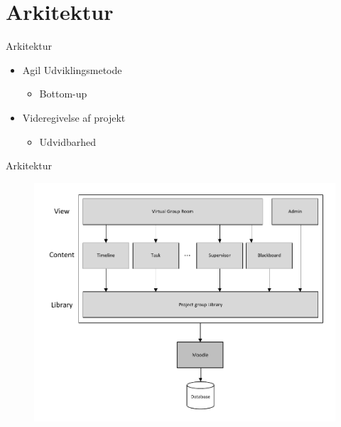 \section{Arkitektur}

\begin{frame}{Arkitektur}
\begin{itemize}
	\item Agil Udviklingsmetode
	\begin{itemize}
		\item Bottom-up  
	\end{itemize}
	\item Videregivelse af projekt
	\begin{itemize}
		\item Udvidbarhed
	\end{itemize}
	
\end{itemize}
\end{frame}


\begin{frame}{Arkitektur}
\begin{figure}%
\includegraphics[width=\columnwidth]{input/assets/architecture}%
\end{figure}	
\end{frame}